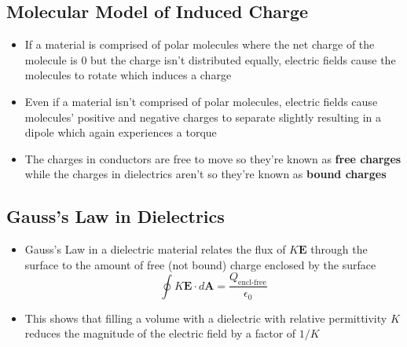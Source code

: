 \documentclass{article}
\begin{document}
\subsection{Molecular Model of Induced Charge}

\begin{itemize}
  \item If a material is comprised of polar molecules where the net charge of the molecule is $0$ but the charge isn't distributed equally, electric fields cause the molecules to rotate which induces a charge

  \item Even if a material isn't comprised of polar molecules, electric fields cause molecules' positive and negative charges to separate slightly resulting in a dipole which again experiences a torque

  \item The charges in conductors are free to move so they're known as \textbf{free charges} while the charges in dielectrics aren't so they're known as \textbf{bound charges}
\end{itemize}

\subsection{Gauss's Law in Dielectrics}

\begin{itemize}
  \item Gauss's Law in a dielectric material relates the flux of $K \mathbf{E}$ through the surface to the amount of free (not bound) charge enclosed by the surface \[\oint K \mathbf{E} \cdot d\mathbf{A} = \frac{Q_\textrm{encl-free}}{\epsilon_0}\]

  \item This shows that filling a volume with a dielectric with relative permittivity $K$ reduces the magnitude of the electric field by a factor of $1 / K$
\end{itemize}
\end{document}
